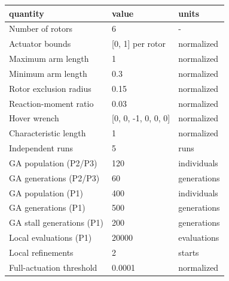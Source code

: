 \begin{tabular}{@{}lll@{}}
\toprule
quantity & value & units \\
\midrule
Number of rotors & 6 & - \\
Actuator bounds & [0, 1] per rotor & normalized \\
Maximum arm length & 1 & normalized \\
Minimum arm length & 0.3 & normalized \\
Rotor exclusion radius & 0.15 & normalized \\
Reaction-moment ratio & 0.03 & normalized \\
Hover wrench & [0, 0, -1, 0, 0, 0] & normalized \\
Characteristic length & 1 & normalized \\
Independent runs & 5 & runs \\
GA population (P2/P3) & 120 & individuals \\
GA generations (P2/P3) & 60 & generations \\
GA population (P1) & 400 & individuals \\
GA generations (P1) & 500 & generations \\
GA stall generations (P1) & 200 & generations \\
Local evaluations (P1) & 20000 & evaluations \\
Local refinements & 2 & starts \\
Full-actuation threshold & 0.0001 & normalized \\
\bottomrule
\end{tabular}
